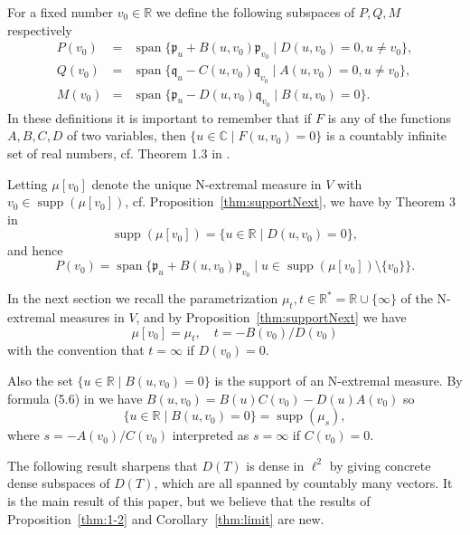 \documentclass [12pt]{article}
\DeclareMathOperator{\spn}{span}
\DeclareMathOperator{\supp}{supp}
\newcommand{\C}{\mathbb{C}}
\newcommand{\R}{\mathbb{R}}
\begin{document}
For a fixed number $v_0\in\R$ we define the following subspaces of $P,Q,M$
respectively
\begin{eqnarray}
P(v_0)&=&\spn\{\mathfrak{p}_u+B(u,v_0)\mathfrak{p}_{v_0} \mid  D(u,v_0)=0, u\neq v_0\},\label{eq:P}\\
Q(v_0)&=&\spn\{\mathfrak{q}_u-C(u,v_0){\mathfrak{q}}_{v_0} \mid  A(u,v_0)=0, u\neq v_0\},\label{eq:Q}\\
M(v_0)&=&\spn\{\mathfrak{p}_u-D(u,v_0){\mathfrak{q}}_{v_0} \mid  B(u,v_0)=0\}\label{eq:M}.
\end{eqnarray}
In these definitions it is important to remember that if $F$ is any of the functions $A,B,C,D$ of two variables, then $\{u\in\C \mid F(u,v_0)=0\}$
is a countably infinite set of real numbers, cf. Theorem 1.3 in \cite{B:S5}.

Letting $\mu[v_0]$ denote the unique N-extremal measure in $V$ with $v_0\in\supp(\mu[v_0])$,
cf. Proposition~\ref{thm:supportNext}, we have by Theorem 3 in \cite{B:C}
\begin{equation}\label{eq:supp}
\supp(\mu[v_0])=\{u\in\R \mid D(u,v_0)=0\},
\end{equation}
and hence
\begin{equation} 
P(v_0)=\spn\{\mathfrak{p}_u+B(u,v_0)\mathfrak{p}_{v_0} \mid u\in\supp(\mu[v_0])
\setminus\{v_0\}\}.
\end{equation}

In the next section we recall the parametrization $\mu_t, t\in\R^*=\R\cup\{\infty\}$ of the N-extremal measures in $V$, and by Proposition~\ref{thm:supportNext} we have
\begin{equation}\label{eq:N-ext}
\mu[v_0]=\mu_t,\quad t=-B(v_0)/D(v_0)
\end{equation}
with the convention that $t=\infty$ if $D(v_0)=0$.

Also the set $\{u\in\R \mid B(u,v_0)=0\}$ is the support of an N-extremal measure. By formula (5.6) in \cite{B:S5} we have $B(u,v_0)=B(u)C(v_0)-D(u)A(v_0)$
so
\begin{equation}\label{eq:N-ext2}
\{u\in\R \mid B(u,v_0)=0\}=\supp(\mu_s),
\end{equation}
where $s=-A(v_0)/C(v_0)$ interpreted as $s=\infty$ if $C(v_0)=0$.

 The following result sharpens that $D(T)$ is dense in $\ell^2$ by giving concrete dense subspaces of $D(T)$, which are all spanned by countably many vectors. It is the main result of this paper, but we believe that the results of Proposition~\ref{thm:1-2} and Corollary~\ref{thm:limit} are new.
\end{document}
